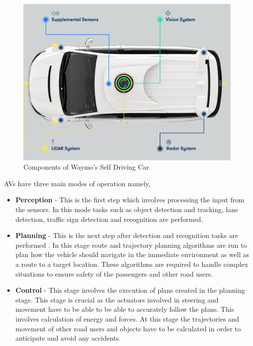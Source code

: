 \begin{figure}[t]
	\centering
	\includegraphics[width=\textwidth]{media/waymo.png}
	\caption{Components of Waymo's Self Driving Car \cite{waymo_2018}}
	\label{fig:my_label}
\end{figure}


AVs have three main modes of operation namely,
\begin{itemize}
	\item \textbf{Perception} - This is the first step which involves processing the input from the sensors. In this mode tasks such as object detection and tracking, lane detection, traffic sign detection and recognition are performed.
	\item \textbf{Planning} - This is the next step after detection and recognition tasks are performed . In this stage route and trajectory planning algorithms are run  to plan how the vehicle should navigate in the immediate environment as well as a route to a target location. These algorithms are required to handle complex situations to ensure safety of the passengers and other road users. 
	\item \textbf{Control} - This stage involves the execution of plans created in the planning stage. This stage is crucial as the actuators involved in steering and movement have to be able to be able to accurately follow the plans. This involves calculation of energy and forces. At this stage the trajectories and movement of other road users and objects have to be calculated in order to anticipate and avoid any accidents. 
	
\end{itemize}



